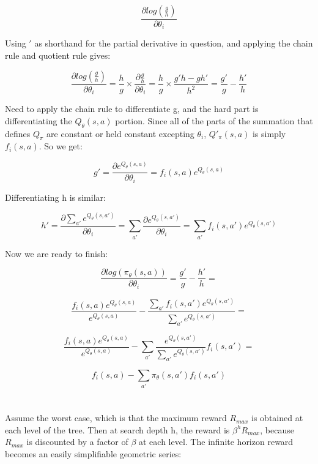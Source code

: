 \documentclass{article}
\begin{document}
\[
\frac{\partial log(\frac{g}{h})}{\partial \theta_i}
\]

Using $'$ as shorthand for the partial derivative in question, and applying the
chain rule and quotient rule gives:

\[
\frac{\partial log(\frac{g}{h})}{\partial \theta_i} = 
\frac{h}{g} \times \frac{\partial \frac{g}{h}}{\partial \theta_i} = 
\frac{h}{g} \times \frac{g'h-gh'}{h^2} = \frac{g'}{g} - \frac{h'}{h}
\]

Need to apply the chain rule to differentiate g, and the hard part is
differentiating the $Q_\theta(s,a)$ portion. Since all of the parts of the 
summation that
defines $Q_{\pi}$ are constant or held constant excepting $\theta_i$, 
$Q'_{\pi}(s,a)$ is simply $f_i(s,a)$. So we get:

\[
g' = \frac{\partial e^{Q_{\theta}(s,a)}}{\partial \theta_i} =
f_i(s,a) e^{Q_{\theta}(s,a)}
\]

Differentiating h is similar:

\[
h' = \frac{\partial \sum_{a'}e^{Q_{\theta}(s,a')}}{\partial \theta_i} = 
\sum_{a'} \frac{\partial e^{Q_{\theta}(s,a')}}{\partial \theta_i} =
\sum_{a'} f_i(s,a') e^{Q_{\theta}(s,a')}
\]

Now we are ready to finish:

\[
\frac{\partial log(\pi_{\theta}(s,a))}{\partial \theta_i} = 
\frac{g'}{g} - \frac{h'}{h} =
\]

\vspace{6pt}

\[
\frac{f_i(s,a) e^{Q_{\theta}(s,a)}}{e^{Q_{\theta}(s,a)}} - 
\frac{\sum_{a'} f_i(s,a') e^{Q_{\theta}(s,a')}}{\sum_{a'} e^{Q_{\theta}(s,a')}}
=
\]

\vspace{6pt}

\[
\frac{f_i(s,a) e^{Q_{\theta}(s,a)}}{e^{Q_{\theta}(s,a)}} - 
\sum_{a'} \frac{e^{Q_{\theta}(s,a')}}{\sum_{a'} e^{Q_{\theta}(s,a')}} f_i(s,a') 
= 
\]

\vspace{6pt}

\[
f_i(s,a) - \sum_{a'}\pi_{\theta}(s,a')f_i(s,a')
\]

\newpage


\section{}

Assume the worst case, which is that the maximum reward $R_{max}$ is obtained
at each level of the tree. Then at search depth h, the reward is
$\beta^h R_{max}$, because $R_{max}$ is discounted by a factor of $\beta$ at
each level. The infinite horizon reward becomes an easily simplifiable
geometric series:
\end{document}
